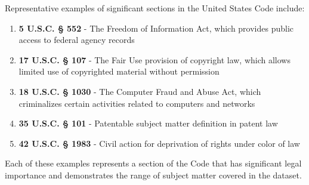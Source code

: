 Representative examples of significant sections in the United States Code include:

\begin{enumerate}
    \item \textbf{5 U.S.C. § 552} - The Freedom of Information Act, which provides public access to federal agency records
    
    \item \textbf{17 U.S.C. § 107} - The Fair Use provision of copyright law, which allows limited use of copyrighted material without permission
    
    \item \textbf{18 U.S.C. § 1030} - The Computer Fraud and Abuse Act, which criminalizes certain activities related to computers and networks
    
    \item \textbf{35 U.S.C. § 101} - Patentable subject matter definition in patent law
    
    \item \textbf{42 U.S.C. § 1983} - Civil action for deprivation of rights under color of law
\end{enumerate}

Each of these examples represents a section of the Code that has significant legal importance and demonstrates the range of subject matter covered in the dataset.
